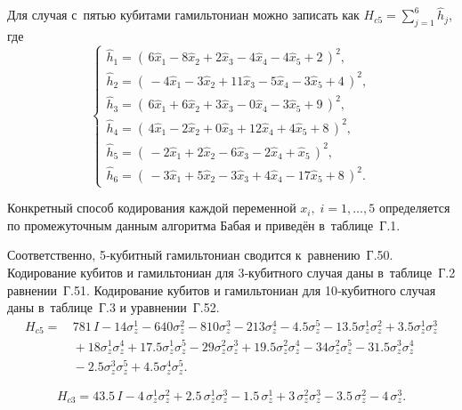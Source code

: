 Для случая с пятью кубитами гамильтониан можно записать как $H_{c5}=
\sum_{j=1}^{6} \hat h_j$, где
\begin{equation}
\begin{cases}
\hat h_{1} = (\, 6\hat x_{1} - 8\hat x_{2} + 2\hat x_{3}
              - 4\hat x_{4} - 4\hat x_{5} + 2\,)^{2},\\[2pt]
\hat h_{2} = (\, -4\hat x_{1} - 3\hat x_{2} + 11\hat x_{3}
              - 5\hat x_{4} - 3\hat x_{5} + 4\,)^{2},\\[2pt]
\hat h_{3} = (\, 6\hat x_{1} + 6\hat x_{2} + 3\hat x_{3}
              - 0\hat x_{4} - 3\hat x_{5} + 9\,)^{2},\\[2pt]
\hat h_{4} = (\, 4\hat x_{1} - 2\hat x_{2} + 0\hat x_{3}
              + 12\hat x_{4} + 4\hat x_{5} + 8\,)^{2},\\[2pt]
\hat h_{5} = (\, -2\hat x_{1} + 2\hat x_{2} - 6\hat x_{3}
              - 2\hat x_{4} + \hat x_{5}\,)^{2},\\[2pt]
\hat h_{6} = (\, -3\hat x_{1} + 5\hat x_{2} - 3\hat x_{3}
              + 4\hat x_{4} - 17\hat x_{5} + 8\,)^{2}.
\end{cases}
\end{equation}

Конкретный способ кодирования каждой переменной $x_i,\; i=1,\dots,5$
определяется по промежуточным данным алгоритма Бабая и приведён в таблице Г.1.

Соответственно, 5‑кубитный гамильтониан сводится к равнению Г.50. Кодирование
кубитов и гамильтониан для 3‑кубитного случая даны в таблице Г.2 равнении Г.51.
Кодирование кубитов и гамильтониан для 10‑кубитного случая даны в таблице Г.3 и
уравнении Г.52.
\begin{equation}
\begin{aligned}
H_{c5}=\, &781\,I
- 14\sigma_{z}^{1}
- 640\sigma_{z}^{2}
- 810\sigma_{z}^{3}
- 213\sigma_{z}^{4}
- 4.5\sigma_{z}^{5}
- 13.5\sigma_{z}^{1}\sigma_{z}^{2}
+ 3.5\sigma_{z}^{1}\sigma_{z}^{3} \\[2pt]
&{}+ 18\sigma_{z}^{1}\sigma_{z}^{4}
+ 17.5\sigma_{z}^{1}\sigma_{z}^{5}
- 29\sigma_{z}^{2}\sigma_{z}^{3}
+ 19.5\sigma_{z}^{2}\sigma_{z}^{4}
- 34\sigma_{z}^{2}\sigma_{z}^{5}
- 31.5\sigma_{z}^{3}\sigma_{z}^{4} \\[2pt]
&{}- 2.5\sigma_{z}^{3}\sigma_{z}^{5}
+ 4.5\sigma_{z}^{4}\sigma_{z}^{5}.
\end{aligned}
\end{equation}

\begin{equation}
H_{c3}=43.5\,I
- 4\,\sigma_{z}^{1}\sigma_{z}^{2}
+ 2.5\,\sigma_{z}^{1}\sigma_{z}^{3}
- 1.5\,\sigma_{z}^{1}
+ 3\,\sigma_{z}^{2}\sigma_{z}^{3}
- 3.5\,\sigma_{z}^{2}
- 4\,\sigma_{z}^{3}.
\end{equation}

